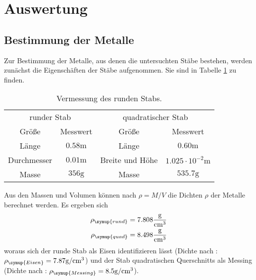 \section{Auswertung}
\label{sec:Auswertung}

\subsection{Bestimmung der Metalle}
  Zur Bestimmung der Metalle, aus denen die untersuchten Stäbe bestehen, werden
  zunächst die Eigenschäften der Stäbe aufgenommen. Sie sind in Tabelle \ref{tab:mass}
  zu finden.

  \begin{table}
    \centering
    \caption{Vermessung des runden Stabs.}
    \label{tab:mass}
    \begin{tabular}{c c c c}
      \toprule
      \multicolumn{2}{c}{runder Stab} & \multicolumn{2}{c}{quadratischer Stab}\\
      \cmidrule(lr){1-2}\cmidrule(lr){3-4}{Größe} & {Messwert } & {Größe} & {Messwert}\\
      \midrule
      Länge & $0.58 \si{\m}$& Länge & $0.60 \si{\m}$\\
      Durchmesser & $0.01 \si{\m}$& Breite und Höhe & $1.025 \cdot 10^{-2} \si{\m}$\\
      Masse & $356 \si{\g}$ & Masse & $535.7 \si{\g}$\\
      \bottomrule
    \end{tabular}
  \end{table}

  \noindent Aus den Massen und Volumen können nach $\rho = M/V$ die Dichten $\rho$ der 
  Metalle berechnet werden. Es ergeben sich
  \begin{align*}
    \rho_{\symup{rund}} = 7.808 \si{\g\per\centi\m\cubed}\\
    \rho_{\symup{quad}} = 8.498 \si{\g\per\centi\m\cubed}
  \end{align*}
  woraus sich der runde Stab als Eisen identifizieren lässt (Dichte nach \cite{dichten}: $\rho_{\symup{Eisen}} = 7.87 \si{\g\per\centi\m\cubed}$)
  und der Stab quadratischen Querschnitts als Messing (Dichte nach \cite{dichten}: $\rho_{\symup{Messing}} = 8.5 \si{\g\per\centi\m\cubed}$).\\

